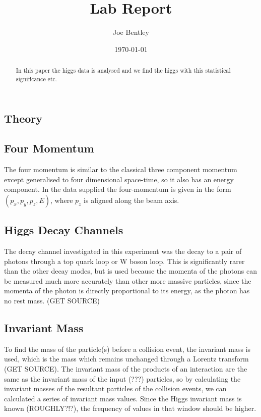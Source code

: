 \documentclass[11pt]{amsart}
\title{Lab Report}
\author{Joe Bentley}
\date{\today}
\begin{document}
\begin{abstract}
  In this paper the higgs data is analysed and we find the higgs with this statistical significance etc.
\end{abstract}

\maketitle

\newpage

\pagestyle{fancyplain}


\begin{multicols}{2}

\section{Theory}

\subsection{Four Momentum}

The four momentum is similar to the classical three component momentum except generalised to four dimensional space-time, so it also has an energy component. In the data supplied the four-momentum is given in the form $(p_x, p_y, p_z, E)$, where $p_z$ is aligned along the beam axis.

\subsection{Higgs Decay Channels}

The decay channel investigated in this experiment was the decay to a pair of photons through a top quark loop or W boson loop. This is significantly rarer than the other decay modes, but is used because the momenta of the photons can be measured much more accurately than other more massive particles, since the momenta of the photon is directly proportional to its energy, as the photon has no rest mass. (GET SOURCE)

\subsection{Invariant Mass}

To find the mass of the particle(s) before a collision event, the invariant mass is used, which is the mass which remains unchanged through a Lorentz transform (GET SOURCE). The invariant mass of the products of an interaction are the same as the invariant mass of the input (???) particles, so by calculating the invariant masses of the resultant particles of the collision events, we can calculated a series of invariant mass values. Since the Higgs invariant mass is known (ROUGHLY?!?), the frequency of values in that window should be higher.


\end{multicols}
\end{document}
